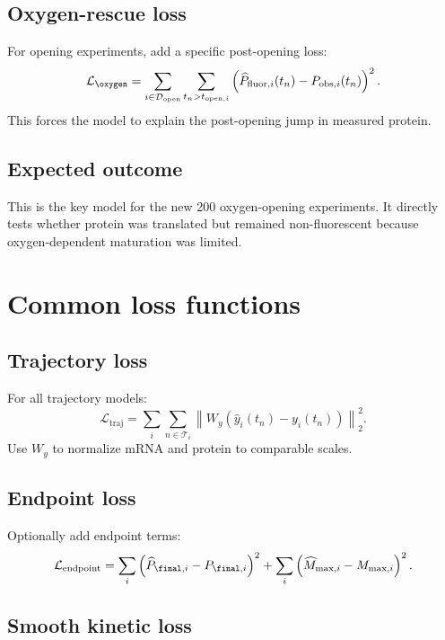 \documentclass[11pt]{article}
\newcommand{\fluor}{\mathrm{fluor}}
\newcommand{\obs}{\mathrm{obs}}
\newcommand{\open}{\mathrm{open}}
\begin{document}
\subsection{Oxygen-rescue loss}

For opening experiments, add a specific post-opening loss:
\begin{equation}
    \mathcal{L}_{\oxygen}
    =
    \sum_{i\in\mathcal{D}_{\open}}
    \sum_{t_n>t_{\open,i}}
    \left(\widehat{P}_{\fluor,i}(t_n)-P_{\obs,i}(t_n)\right)^2.
\end{equation}
This forces the model to explain the post-opening jump in measured protein.

\subsection{Expected outcome}

This is the key model for the new 200 oxygen-opening experiments. It directly tests whether protein was translated but remained non-fluorescent because oxygen-dependent maturation was limited.

\section{Common loss functions}

\subsection{Trajectory loss}

For all trajectory models:
\begin{equation}
    \mathcal{L}_{\mathrm{traj}}
    =
    \sum_i\sum_{n\in\mathcal{T}_i}
    \left\lVert
    W_y\left(\widehat{y}_i(t_n)-y_i(t_n)\right)
    \right\rVert_2^2.
\end{equation}
Use $W_y$ to normalize mRNA and protein to comparable scales.

\subsection{Endpoint loss}

Optionally add endpoint terms:
\begin{equation}
    \mathcal{L}_{\mathrm{endpoint}}
    =
    \sum_i
    \left(\widehat{P}_{\final,i}-P_{\final,i}\right)^2
    +
    \sum_i
    \left(\widehat{M}_{\max,i}-M_{\max,i}\right)^2.
\end{equation}

\subsection{Smooth kinetic loss}
\end{document}
